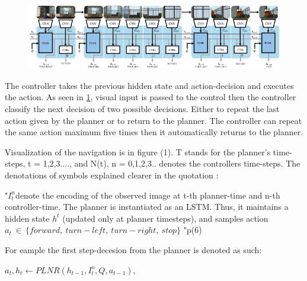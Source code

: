 \begin{figure}[H]
\includegraphics[scale=0.53]{images/nav.png}
\caption{}
\label{fig:nav}
\end{figure}

The controller takes the previous hidden state and action-decision and executes the action. As seen in \ref{fig:nav}, visual input is passed to the control then the controller classify the next decision of two possible decisions. Either to repeat the last action given by the planner or to return to the planner. The controller can repeat the same action maximum five times then it automatically returns to the planner. 

Visualization of the navigation is in figure (1). T stands for the planner's time-steps, t = 1,2,3...., and N(t),  n = 0,1,2,3.. denotes the controllers time-steps. The denotations of symbols explained clearer in the quotation : 


"\begin{math}  I_{t}^{n} \end{math}denote the encoding of the observed image at t-th planner-time and n-th controller-time. The planner is instantiated as an LSTM. Thus, it maintains a hidden state \begin{math} h^{t}\end{math}
(updated only at planner timesteps), and samples action 
\begin{math}  a_{t} \ \in \ \{forward,\ turn-left,\ turn-right,\ stop\} \end{math} "p(6)
\vspace{0.3cm}

For eample the first  step-decesion from the planner is denoted as such: 
\vspace{0.3cm}

\hspace{1cm}        \begin{math} a_{t} ,h_{t}{}\leftarrow PLNR\left( h_{t-1} ,I_{t}^{o} ,Q,a_{t-1}\right) \end{math},
        
\vspace{0.3cm}

